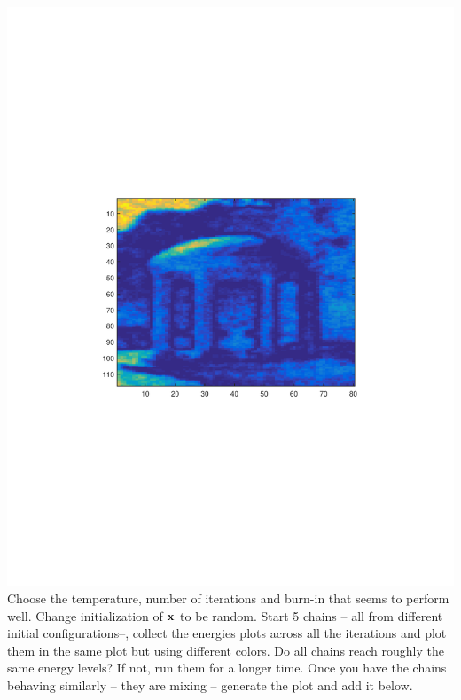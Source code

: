 \documentclass{article}
\begin{document}
\begin{figure}
\begin{tabular}{ccc}
\end{tabular}
\end{figure}
\includegraphics[scale=0.25]{var.pdf}
\newproblem{2pt} Choose the temperature, number of iterations and burn-in that seems to perform well.
Change initialization of $\mathbf{x}$ to be random.
Start 5 chains -- all from different initial configurations--, collect the energies plots across all the iterations and plot them in the same plot but
using different colors.
Do all chains reach roughly the same energy levels? If not, run them for a longer time.
Once you have the chains behaving similarly -- they are mixing -- generate the plot and add it below.
\end{document}
